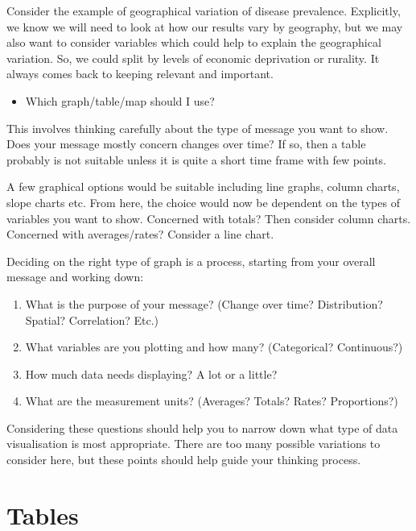 \documentclass[
]{book}
\providecommand{\tightlist}{%
  \setlength{\itemsep}{0pt}\setlength{\parskip}{0pt}}
\begin{document}
Consider the example of geographical variation of disease prevalence. Explicitly, we know we will need to look at how our results vary by geography, but we may also want to consider variables which could help to explain the geographical variation. So, we could split by levels of economic deprivation or rurality. It always comes back to keeping relevant and important.

\begin{itemize}
\tightlist
\item
  Which graph/table/map should I use?
\end{itemize}

This involves thinking carefully about the type of message you want to show.
Does your message mostly concern changes over time? If so, then a table probably is not suitable unless it is quite a short time frame with few points.

A few graphical options would be suitable including line graphs, column charts, slope charts etc. From here, the choice would now be dependent on the types of variables you want to show. Concerned with totals? Then consider column charts. Concerned with averages/rates? Consider a line chart.

Deciding on the right type of graph is a process, starting from your overall message and working down:

\begin{enumerate}
\def\labelenumi{\arabic{enumi}.}
\item
  What is the purpose of your message? (Change over time? Distribution? Spatial? Correlation? Etc.)
\item
  What variables are you plotting and how many? (Categorical? Continuous?)
\item
  How much data needs displaying? A lot or a little?
\item
  What are the measurement units? (Averages? Totals? Rates? Proportions?)
\end{enumerate}

Considering these questions should help you to narrow down what type of data visualisation is most appropriate. There are too many possible variations to consider here, but these points should help guide your thinking process.

\hypertarget{tables}{%
\chapter{Tables}\label{tables}}
\end{document}
